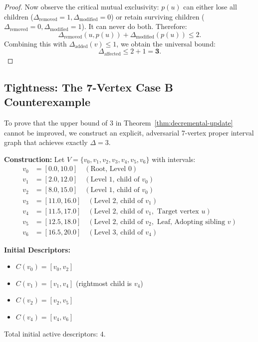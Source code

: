 \begin{proof}
Now observe the critical mutual exclusivity: $p(u)$ can either lose all children ($\Delta_{\text{removed}} = 1, \Delta_{\text{modified}} = 0$) or retain surviving children ($\Delta_{\text{removed}} = 0, \Delta_{\text{modified}} = 1$). It can never do both. Therefore:
\begin{equation}
    \Delta_{\text{removed}}(u, p(u)) + \Delta_{\text{modified}}(p(u)) \le 2.
\end{equation}
Combining this with $\Delta_{\text{added}}(v) \le 1$, we obtain the universal bound:
\begin{equation}
    \Delta_{\text{affected}} \le 2 + 1 = \mathbf{3}.
\end{equation}
\end{proof}

\subsection{Tightness: The 7-Vertex Case B Counterexample}
\label{sec:tightness_counterexample}

To prove that the upper bound of $3$ in Theorem~\ref{thm:decremental-update} cannot be improved, we construct an explicit, adversarial 7-vertex proper interval graph that achieves exactly $\Delta = 3$.

\textbf{Construction:}
Let $V = \{v_0, v_1, v_2, v_3, v_4, v_5, v_6\}$ with intervals:
\begin{align*}
    v_0 &= [0.0, 10.0] \quad (\text{Root, Level 0})\\
    v_1 &= [2.0, 12.0] \quad (\text{Level 1, child of } v_0)\\
    v_2 &= [8.0, 15.0] \quad (\text{Level 1, child of } v_0)\\
    v_3 &= [11.0, 16.0] \quad (\text{Level 2, child of } v_1)\\
    v_4 &= [11.5, 17.0] \quad (\text{Level 2, child of } v_1, \text{ Target vertex } u)\\
    v_5 &= [12.5, 18.0] \quad (\text{Level 2, child of } v_2, \text{ Leaf, Adopting sibling } v)\\
    v_6 &= [16.5, 20.0] \quad (\text{Level 3, child of } v_4)
\end{align*}

\textbf{Initial Descriptors:}
\begin{itemize}
    \item $C(v_0) = [v_0, v_2]$
    \item $C(v_1) = [v_1, v_4]$ (rightmost child is $v_4$)
    \item $C(v_2) = [v_2, v_5]$
    \item $C(v_4) = [v_4, v_6]$
\end{itemize}
Total initial active descriptors: $4$.

